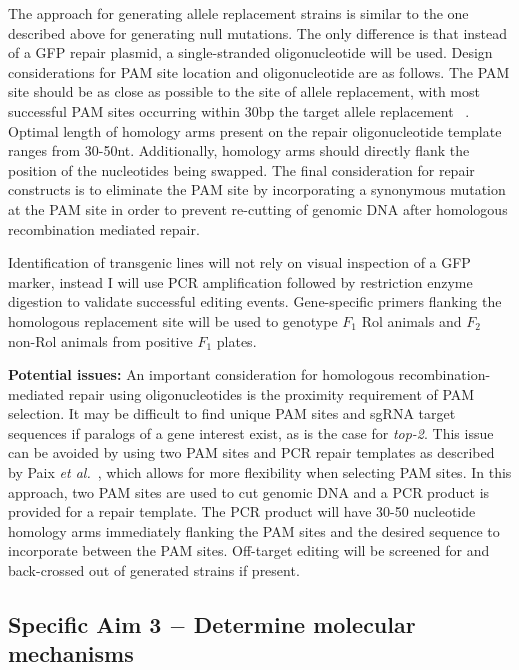 \documentclass[12pt]{article}
\begin{document}
The approach for generating allele replacement strains is similar to the one described above for generating null mutations. The only difference is that instead of a GFP repair plasmid, a single-stranded oligonucleotide will be used. Design considerations for PAM site location and oligonucleotide are as follows. The PAM site should be as close as possible to the site of allele replacement, with most successful PAM sites occurring within 30bp the target allele replacement ~\cite{Arribere:2014ku,Paix:2014eu}. Optimal length of homology arms present on the repair oligonucleotide template ranges from 30-50nt. Additionally, homology arms should directly flank the position of the nucleotides being swapped. The final consideration for repair constructs is to eliminate the PAM site by incorporating a synonymous mutation at the PAM site in order to prevent re-cutting of genomic DNA after homologous recombination mediated repair. 
\vspace{5pt}

Identification of transgenic lines will not rely on visual inspection of a GFP marker, instead I will use PCR amplification followed by restriction enzyme digestion to validate successful editing events. Gene-specific primers flanking the homologous replacement site will be used to genotype $F_{1}$ Rol animals and $F_{2}$ non-Rol animals from positive $F_{1}$ plates. 
\vspace{5pt}

{\bf Potential issues: }An important consideration for homologous recombination-mediated repair using oligonucleotides is the proximity requirement of PAM selection. It may be difficult to find unique PAM sites and sgRNA target sequences if paralogs of a gene interest exist, as is the case for {\it top-2}. This issue can be avoided by using two PAM sites and PCR repair templates as described by Paix {\it et al.}~\cite{Paix:2014eu}, which allows for more flexibility when selecting PAM sites. In this approach, two PAM sites are used to cut genomic DNA and a PCR product is provided for a repair template. The PCR product will have 30-50 nucleotide homology arms immediately flanking the PAM sites and the desired sequence to incorporate between the PAM sites. Off-target editing will be screened for and back-crossed out of generated strains if present.
\vspace{-5pt}
\subsection{Specific Aim 3 $-$ Determine molecular mechanisms
}\label{Aim3}
\end{document}
